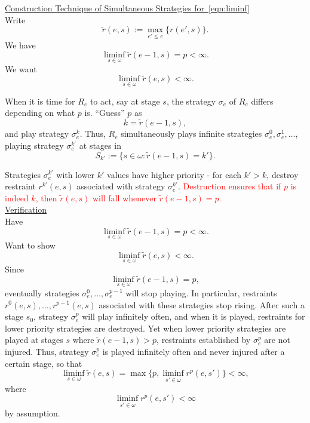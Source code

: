 \documentclass{article}
\newcommand{\COMMENT}[1]{\textcolor{red}{#1}}
\begin{document}
  \underline{Construction Technique of Simultaneous Strategies
  for~\eqref{eqn:liminf}}\\
  Write
  \[\tilde{r}(e,s) :=\max_{e'\leq e}\{r(e',s)\}.\]
  We have
  \[\liminf_{s\in\omega} \tilde{r}(e-1,s) =p<\infty.\]
  We want
  \[\liminf_{s\in\omega} \tilde{r}(e,s)<\infty.\]

  When it is time for $R_e$ to act, say at stage $s$, the strategy
  $\sigma_e$ of $R_e$ differs depending on what $p$ is. ``Guess'' $p$ as
  \[k=\tilde{r}(e-1,s),\]
  and play strategy $\sigma_e^k$. Thus, $R_e$ simultaneously plays
  infinite strategies $\sigma_e^0,\sigma_e^1,\ldots$, playing strategy
  $\sigma_e^{k'}$ at stages in
  \[S_{k'} :=\{s\in\omega: \tilde{r}(e-1,s)=k'\}.\]

  Strategies $\sigma_e^{k'}$ with lower $k'$ values
  have higher priority - for each $k'>k$, destroy restraint
  $r^{k'}(e,s)$ associated with strategy $\sigma_e^{k'}$.
  \COMMENT{Destruction ensures that if $p$ is indeed $k$, then
  $\tilde{r}(e,s)$ will fall whenever $\tilde{r}(e-1,s)=p$.}\\

  \underline{Verification}\\
  Have
  \[\liminf_{s\in\omega} \tilde{r}(e-1,s) =p<\infty.\]
  Want to show
  \[\liminf_{s\in\omega} \tilde{r}(e,s)<\infty.\]
  Since 
  \[\liminf_{s\in\omega} \tilde{r}(e-1,s) =p,\]
  eventually strategies $\sigma_e^0,\ldots,\sigma_e^{p-1}$ will
  stop playing. In particular, restraints
  $r^0(e,s),\ldots,r^{p-1}(e,s)$ associated with these strategies
  stop rising. After such a stage $s_0$, strategy $\sigma_e^{p}$ will
  play infinitely often, and when it is played, restraints for lower
  priority strategies are destroyed. Yet when lower priority strategies are
  played at stages $s$ where $\tilde{r}(e-1,s)>p$,
  restraints established by $\sigma_e^{p}$ are not injured. Thus,
  strategy $\sigma_e^{p}$ is played infinitely often and never
  injured after a certain stage, so that
  \[\liminf_{s\in\omega} \tilde{r}(e,s) =\max\{p,
  \liminf_{s'\in\omega} r^{p}(e,s')\} <\infty,\]
  where
  \[\liminf_{s'\in\omega} r^{p}(e,s') <\infty\]
  by assumption.
\end{document}
